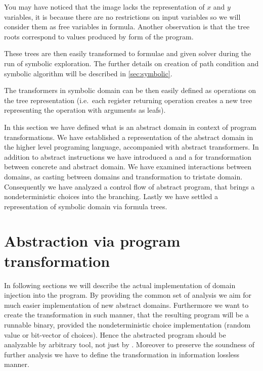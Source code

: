 You may have noticed that the image lacks the representation of $x$ and $y$
variables, it is because there are no restrictions on input variables so we will
consider them as free variables in formula. Another observation is that the tree
roots correspond to values produced by \SSA form of the program.

These trees are then easily transformed to formulae and given \SMT solver during
the run of symbolic exploration. The further details on creation of path
condition and symbolic algorithm will be described in \autoref{sec:symbolic}.

The transformers in symbolic domain can be then easily defined as operations on
the tree representation (i.e.~each register returning operation creates a new
tree representing the operation with arguments as leafs).

\begin{summary}
In this section we have defined what is an abstract domain in context of program
transformations. We have established a representation of the abstract domain in
the higher level programing language, accompanied with abstract transformers. In
addition to abstract \LLVM instructions we have introduced a  and a
 for transformation between concrete and abstract domain. We have
examined interactions between domains, as casting between domains and
transformation to tristate domain. Consequently we have analyzed a control flow
of abstract program, that brings a nondeterministic choices into the
branching. Lastly we have settled a representation of symbolic domain via formula
trees.
\end{summary}

\section{Abstraction via program transformation}

In following sections we will describe the actual implementation of domain
injection into the program. By providing the common set of analysis we aim for
much easier implementation of new abstract domains. Furthermore we want to
create the transformation in such manner, that the resulting program will be a
runnable binary, provided the nondeterministic choice implementation (random
value or bit-vector of choices). Hence the abstracted program should be
analyzable by arbitrary tool, not just by \DIVINE. Moreover to preserve
the soundness of further analysis we have to define the transformation in
information lossless manner.

